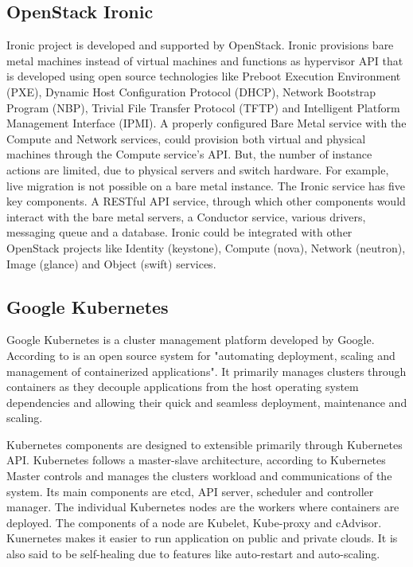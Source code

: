\subsection{OpenStack Ironic}

     Ironic \cite{www-ironicwebsite} project is developed and
     supported by OpenStack. Ironic provisions bare metal machines
     instead of virtual machines and functions as hypervisor API that
     is developed using open source technologies like Preboot
     Execution Environment (PXE), Dynamic Host Configuration Protocol
     (DHCP), Network Bootstrap Program (NBP), Trivial File Transfer
     Protocol (TFTP) and Intelligent Platform Management Interface
     (IPMI). A properly configured Bare Metal service with the Compute
     and Network services, could provision both virtual and physical
     machines through the Compute service’s API. But, the number of
     instance actions are limited, due to physical servers and switch
     hardware. For example, live migration is not possible on a bare
     metal instance. The Ironic service has five key components. A
     RESTful API service, through which other components would
     interact with the bare metal servers, a Conductor service,
     various drivers, messaging queue and a database. Ironic could be
     integrated with other OpenStack projects like Identity
     (keystone), Compute (nova), Network (neutron), Image (glance) and
     Object (swift) services.
     
\subsection{Google Kubernetes}

     Google Kubernetes is a cluster management platform developed by
     Google. According to \cite{www-kubernetesdoc} is an open source
     system for "automating deployment, scaling and management of
     containerized applications". It primarily manages clusters
     through containers as they decouple applications from the
     host operating system dependencies and allowing their quick and
     seamless deployment, maintenance and scaling.

     Kubernetes components are designed to extensible primarily
     through Kubernetes API. Kubernetes follows a master-slave
     architecture, according to \cite{www-kuberneteswiki} Kubernetes
     Master controls and manages the clusters workload and
     communications of the system. Its main components are etcd, API
     server, scheduler and controller manager. The individual
     Kubernetes nodes are the workers where containers are
     deployed. The components of a node are Kubelet, Kube-proxy and
     cAdvisor. Kunernetes makes it easier to run application on public
     and private clouds. It is also said to be self-healing due to
     features like auto-restart and auto-scaling.
     
